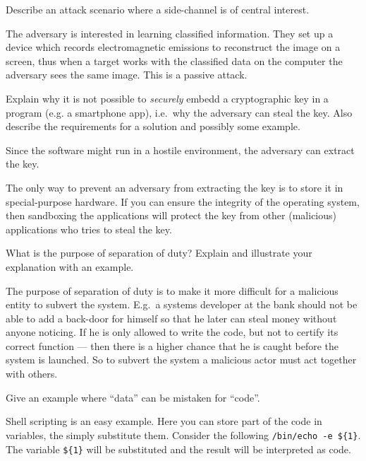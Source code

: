   
\question[2]\label{q:sidechannels}
Describe an attack scenario where a side-channel is of central interest.

\begin{solution}
  The adversary is interested in learning classified information.
  They set up a device which records electromagnetic emissions to reconstruct 
  the image on a screen, thus when a target works with the classified data on 
  the computer the adversary sees the same image.
  This is a passive attack.
\end{solution}

\question[3]
  Explain why it is not possible to \emph{securely} embedd a cryptographic key 
  in a program (e.g. a smartphone app), i.e.\ why the adversary can steal the 
  key.
  Also describe the requirements for a solution and possibly some example.

  \begin{solution}
    Since the software might run in a hostile environment, the adversary can 
    extract the key.

    The only way to prevent an adversary from extracting the key is to store it 
    in special-purpose hardware.
    If you can ensure the integrity of the operating system, then sandboxing 
    the applications will protect the key from other (malicious) applications 
    who tries to steal the key.
  \end{solution}

\question[3]
What is the purpose of separation of duty?
Explain and illustrate your explanation with an example.

\begin{solution}
  The purpose of separation of duty is to make it more difficult for 
  a malicious entity to subvert the system.
  E.g.\ a systems developer at the bank should not be able to add a back-door 
  for himself so that he later can steal money without anyone noticing.
  If he is only allowed to write the code, but not to certify its correct 
  function --- then there is a higher chance that he is caught before the 
  system is launched.
  So to subvert the system a malicious actor must act together with others.
\end{solution}


\question[3]
Give an example where \enquote{data} can be mistaken for \enquote{code}.

\begin{solution}
  Shell scripting is an easy example.
  Here you can store part of the code in variables, the simply substitute them.
  Consider the following \texttt{/bin/echo -e \$\{1\}}.
  The variable \texttt{\$\{1\}} will be substituted and the result will be 
  interpreted as code.
\end{solution}


